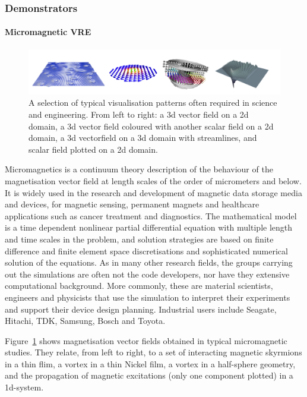 \subsubsection{Demonstrators}
\paragraph{Micromagnetic VRE}
\label{sec:introduction-micromagnetic-vre-demonstrator}

\begin{figure}
\includegraphics[width=1.0\textwidth]{Pictures/micromagnetic-and-3d-vis-4x1.pdf}
\caption{\label{fig:3d-plots} A selection of typical visualisation patterns often required in science and engineering. From left to right: a 3d vector field on a 2d domain, a 3d vector field coloured with another scalar field on a 2d domain, a 3d vectorfield on a 3d domain with streamlines, and scalar field plotted on a 2d domain.}
\end{figure}

Micromagnetics is a continuum theory description of the behaviour of
the magnetisation vector field at length scales of the order of
micrometers and below. It is widely used in the research and
development of magnetic data storage media and devices, for magnetic
sensing, permanent magnets and healthcare applications such as cancer
treatment and diagnostics. The mathematical model is a time dependent
nonlinear partial differential equation with multiple length and time
scales in the problem, and solution strategies are based on finite
difference and finite element space discretisations and sophisticated
numerical solution of the equations. As in many other research fields,
the groups carrying out the simulations are often not the code
developers, nor have they extensive computational background. More
commonly, these are material scientists, engineers and physicists that
use the simulation to interpret their experiments and support their
device design planning. Industrial users include Seagate, Hitachi,
TDK, Samsung, Bosch and Toyota.

Figure~\ref{fig:3d-plots} shows magnetisation vector fields obtained
in typical micromagnetic studies. They relate, from left to
right, to a set of interacting magnetic skyrmions in a thin flim, a
vortex in a thin Nickel film, a vortex in a half-sphere geometry, and
the propagation of magnetic excitations (only one component plotted)
in a 1d-system.

